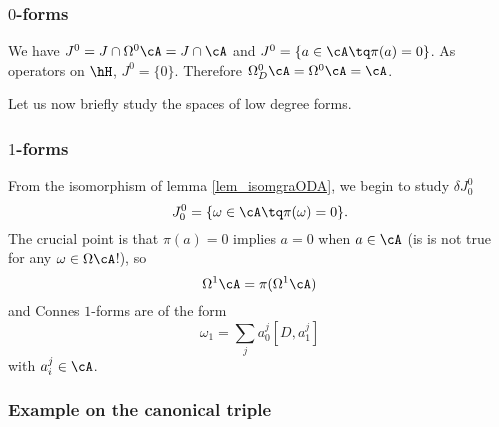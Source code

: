 \subsubsection{\texorpdfstring{$0$}{t}-forms}

We have $J^0=J\cap\Omega^0\cA=J\cap\cA$ and $J^0=\{ a\in\cA\tq \pi(a)=0 \}$. As operators on $\hH$, $J^0=\{ 0 \}$. Therefore $\Omega^0_D\cA=\Omega^0\cA=\cA$.

Let us now briefly study the spaces of low degree forms.

\subsubsection{\texorpdfstring{$1$}{1}-forms}

From the isomorphism of lemma \ref{lem_isomgraODA}, we begin to study $\delta J_0^0$
\[ 
  J_0^0=\{ \omega\in\cA\tq\pi(\omega)=0 \}.
\]
The crucial point is that $\pi(a)=0$ implies $a=0$ when $a\in\cA$ (is is not true for any $\omega\in\Omega\cA$!), so
\begin{equation}
\Omega^1\cA=\pi(\Omega^1\cA)
\end{equation}
and Connes $1$-forms are of the form
\[ 
  \omega_1=\sum_ja_0^j[D,a_1^j]
\]
with $a_i^j\in\cA$.

\subsubsection{Example on the canonical triple}



